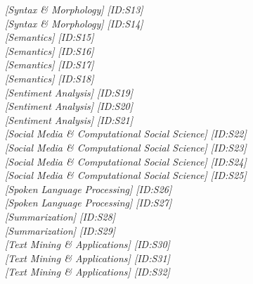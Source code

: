 \hfill \textit{[Syntax \& Morphology]  [ID:S13]} \\ 
\hfill \textit{[Syntax \& Morphology]  [ID:S14]} \\ 
\hfill \textit{[Semantics]  [ID:S15]} \\ 
\hfill \textit{[Semantics]  [ID:S16]} \\ 
\hfill \textit{[Semantics]  [ID:S17]} \\ 
\hfill \textit{[Semantics]  [ID:S18]} \\ 
\hfill \textit{[Sentiment Analysis]  [ID:S19]} \\ 
\hfill \textit{[Sentiment Analysis]  [ID:S20]} \\ 
\hfill \textit{[Sentiment Analysis]  [ID:S21]} \\ 
\hfill \textit{[Social Media \& Computational Social Science]  [ID:S22]} \\ 
\hfill \textit{[Social Media \& Computational Social Science]  [ID:S23]} \\ 
\hfill \textit{[Social Media \& Computational Social Science]  [ID:S24]} \\ 
\hfill \textit{[Social Media \& Computational Social Science]  [ID:S25]} \\ 
\hfill \textit{[Spoken Language Processing]  [ID:S26]} \\ 
\hfill \textit{[Spoken Language Processing]  [ID:S27]} \\ 
\hfill \textit{[Summarization]  [ID:S28]} \\ 
\hfill \textit{[Summarization]  [ID:S29]} \\ 
\hfill \textit{[Text Mining \& Applications]  [ID:S30]} \\ 
\hfill \textit{[Text Mining \& Applications]  [ID:S31]} \\ 
\hfill \textit{[Text Mining \& Applications]  [ID:S32]} \\ 
